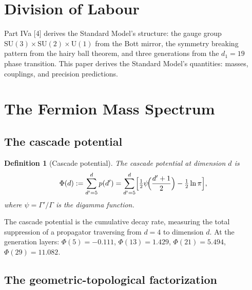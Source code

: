 \documentclass[12pt,a4paper]{article}
\newtheorem{definition}[theorem]{Definition}
\begin{document}
\begin{abstract}
The cascade's predictions separate into two populations with distinct error signatures. Descent-dependent quantities ($\alpha_s$, $v$, $\Omega_m$, mass ratios, $m_\tau$, $m_W$) carry uniformly negative deviations of $-0.13\%$ to $-2.20\%$ (7/7 negative). Geometric quantities ($m_H/m_W$, $\sin^2\theta_W$, $\theta_C$, $\Omega_b$) carry positive deviations of $+0.56\%$ to $+2.76\%$ (4/4 positive). The sign separation identifies the subleading cascade descent as the source of the dominant systematic.
\end{abstract}

\tableofcontents
\newpage

\section{Division of Labour}

Part IVa [4] derives the Standard Model's structure: the gauge group $\text{SU}(3) \times \text{SU}(2) \times \text{U}(1)$ from the Bott mirror, the symmetry breaking pattern from the hairy ball theorem, and three generations from the $d_1 = 19$ phase transition. This paper derives the Standard Model's quantities: masses, couplings, and precision predictions.

\section{The Fermion Mass Spectrum}

\subsection{The cascade potential}

\begin{definition}[Cascade potential]
The cascade potential at dimension $d$ is
\[
\Phi(d) := \sum_{d'=5}^{d} p(d') = \sum_{d'=5}^{d} \Bigl[\tfrac{1}{2}\psi\!\Bigl(\frac{d'+1}{2}\Bigr) - \tfrac{1}{2}\ln\pi\Bigr],
\]
where $\psi = \Gamma'/\Gamma$ is the digamma function.
\end{definition}

The cascade potential is the cumulative decay rate, measuring the total suppression of a propagator traversing from $d = 4$ to dimension $d$. At the generation layers: $\Phi(5) = -0.111$, $\Phi(13) = 1.429$, $\Phi(21) = 5.494$, $\Phi(29) = 11.082$.

\subsection{The geometric-topological factorization}
\end{document}
